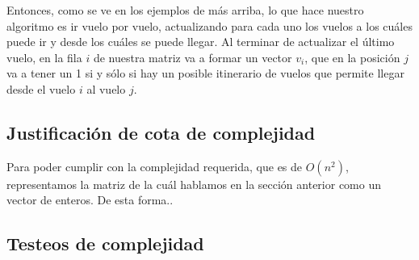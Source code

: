 \documentclass[11pt, a4paper, twoside]{article}
\begin{document}
Entonces, como se ve en los ejemplos de más arriba, lo que hace nuestro algoritmo
es ir vuelo por vuelo, actualizando para cada uno los vuelos a los cuáles puede
ir y desde los cuáles se puede llegar. Al terminar de actualizar el último vuelo,
en la fila $i$ de nuestra matriz va a formar un vector $v_{i}$, que en la posición
$j$ va a tener un 1 si y sólo si hay un posible itinerario de vuelos que permite
llegar desde el vuelo $i$ al vuelo $j$. \\

\subsection{Justificación de cota de complejidad}
Para poder cumplir con la complejidad requerida, que es de $O(n^2)$, representamos
la matriz de la cuál hablamos en la sección anterior como un vector de enteros.
De esta forma..

\subsection{Testeos de complejidad}



\end{document}
